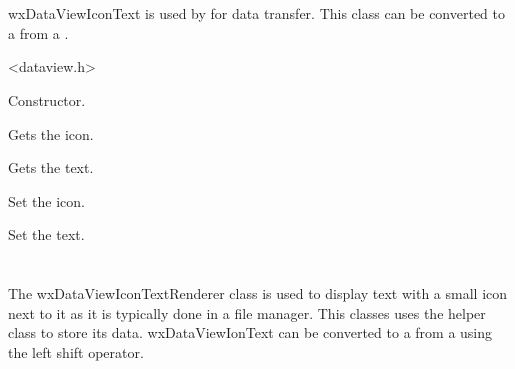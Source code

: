 \section{}\label{wxdataviewicontext}

wxDataViewIconText is used by 
for data transfer. This class can be converted to a from
a .




<dataview.h>

\label{wxdataviewicontextwxdataviewicontext}



Constructor.

\label{wxdataviewicontextgeticon}


Gets the icon.

\label{wxdataviewicontextgettext}


Gets the text.

\label{wxdataviewicontextseticon}


Set the icon.

\label{wxdataviewicontextsettext}


Set the text.

\section{}\label{wxdataviewicontextrenderer}

The wxDataViewIconTextRenderer class is used to display text with
a small icon next to it as it is typically done in a file manager.
This classes uses the 
helper class to store its data. wxDataViewIonText can be converted
to a from a  using the left shift
operator.

